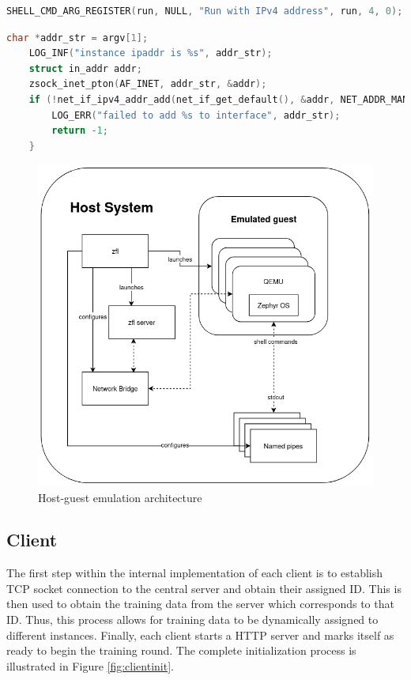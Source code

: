 \documentclass[12pt]{article}
\begin{document}
\begin{lstlisting}[language=C, caption=Registering user defined command ``run'' to the function
pointer run,label={lst:shellcmd}]
SHELL_CMD_ARG_REGISTER(run, NULL, "Run with IPv4 address", run, 4, 0);
\end{lstlisting}

\begin{lstlisting}[language=C, caption=The ``run'' function which performs IP address assignment at
runtime,label={lst:run}]
    char *addr_str = argv[1];
    LOG_INF("instance ipaddr is %s", addr_str);
    struct in_addr addr;
    zsock_inet_pton(AF_INET, addr_str, &addr);
    if (!net_if_ipv4_addr_add(net_if_get_default(), &addr, NET_ADDR_MANUAL, UINT32_MAX)) {
        LOG_ERR("failed to add %s to interface", addr_str);
        return -1;
    }
\end{lstlisting}

\begin{figure}
  \includegraphics[scale=0.8]{architecture}
  \caption{Host-guest emulation architecture}
  \label{fig:architecture}
\centering
\end{figure}

\subsection{Client}
The first step within the internal implementation of each client is to establish TCP socket connection to the central server and obtain
their assigned ID. This is then used to obtain the training data from the server which corresponds
to that ID. Thus, this process allows for training data to be dynamically assigned to different
instances. Finally, each client starts a HTTP server and marks itself as ready to begin the training round.
The complete initialization process is illustrated in Figure \ref{fig:clientinit}.
\end{document}
